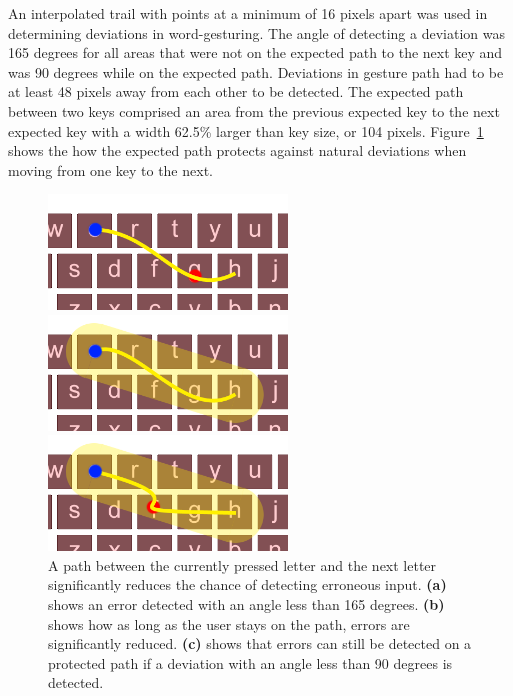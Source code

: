 An interpolated trail with points at a minimum of 16 pixels apart was used in determining deviations in word-gesturing. The angle of detecting a deviation was 165 degrees for all areas that were not on the expected path to the next key and was 90 degrees while on the expected path. Deviations in gesture path had to be at least 48 pixels away from each other to be detected. The expected path between two keys comprised an area from the previous expected key to the next expected key with a width 62.5\% larger than key size, or 104 pixels. Figure~\ref{protected_path} shows the how the expected path protects against natural deviations when moving from one key to the next.

\begin{figure}[h]
	\centering
	\begin{minipage}[t]{3in}
		\includegraphics[width=2.5in]{fig_path_no_protection}
	\end{minipage}
	\begin{minipage}[t]{2.5in}
		\includegraphics[width=2.5in]{fig_path_no_error}
	\end{minipage}
	\begin{minipage}[t]{2.5in}
		\includegraphics[width=2.5in]{fig_path_with_error}
	\end{minipage}
	\caption[Protected Path Example]{A path between the currently pressed letter and the next letter significantly reduces the chance of detecting erroneous input. \textbf{(a)} shows an error detected with an angle less than 165 degrees. \textbf{(b)} shows how as long as the user stays on the path, errors are significantly reduced. \textbf{(c)} shows that errors can still be detected on a protected path if a deviation with an angle less than 90 degrees is detected.}
	\label{protected_path}
\end{figure}


